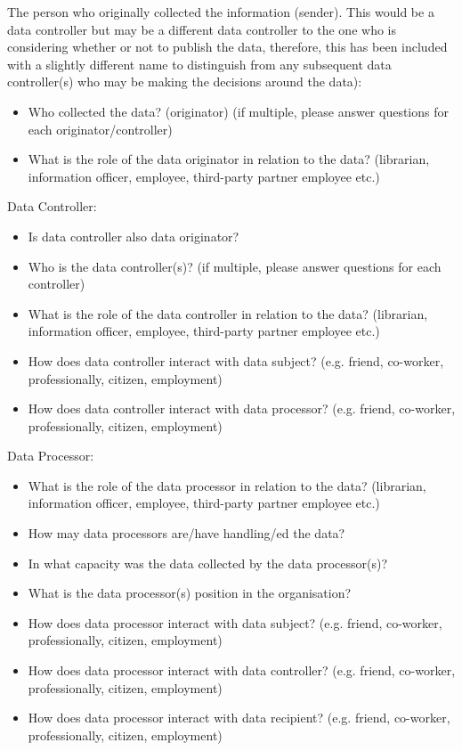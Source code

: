 The person who originally collected the information (sender). This would be a data controller but may be a different data controller to the one who is considering whether or not to publish the data, therefore, this has been included with a slightly different name to distinguish from any subsequent data controller(s) who may be making the decisions around the data): \\
 \begin{itemize}
\item Who collected the data? (originator) (if multiple, please answer questions for each originator/controller)
\item What is the role of the data originator in relation to the data? (librarian, information officer, employee, third-party partner employee etc.)\\
\end{itemize}
Data Controller:
\begin{itemize}
\item Is data controller also data originator?
\item Who is the data controller(s)? (if multiple, please answer questions for each controller)
\item What is the role of the data controller in relation to the data? (librarian, information officer, employee, third-party partner employee etc.)
\item How does data controller interact with data subject? (e.g. friend, co-worker, professionally, citizen, employment)
\item How does data controller interact with data processor? (e.g. friend, co-worker, professionally, citizen, employment)\\
\end{itemize}
Data Processor:
\begin{itemize}

\item What is the role of the data processor in relation to the data? (librarian, information officer, employee, third-party partner employee etc.)
\item How may data processors are/have handling/ed the data?
\item In what capacity was the data collected by the data processor(s)?
\item What is the data processor(s) position in the organisation?
\item How does data processor interact with data subject? (e.g. friend, co-worker, professionally, citizen, employment)
\item How does data processor interact with data controller? (e.g. friend, co-worker, professionally, citizen, employment)
\item How does data processor interact with data recipient? (e.g. friend, co-worker, professionally, citizen, employment)\\
\end{itemize}
